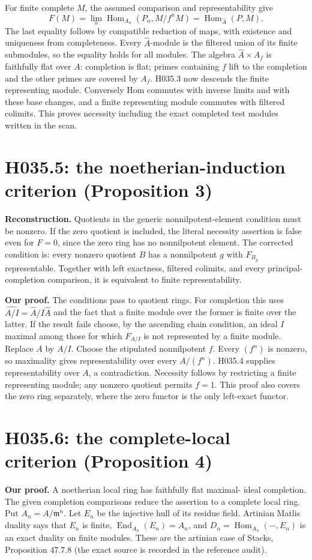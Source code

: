 For finite complete $M$, the assumed comparison and representability give
\[
 F(M)=\lim_n\operatorname{Hom}_{A_n}(P_n,M/f^nM)
       =\operatorname{Hom}_{\widehat A}(P,M).
\]
The last equality follows by compatible reduction of maps, with existence
and uniqueness from completeness. Every $\widehat A$-module is the
filtered union of its finite submodules, so the equality holds for all
modules. The algebra $\widehat A\times A_f$ is faithfully flat over
$A$: completion is flat; primes containing $f$ lift to the completion
and the other primes are covered by $A_f$. H035.3 now descends the finite
representing module. Conversely Hom commutes with inverse limits and
with these base changes, and a finite representing module commutes with
filtered colimits. This proves necessity including the exact completed
test modules written in the scan.

\section{H035.5: the noetherian-induction criterion (Proposition 3)}
\textbf{Reconstruction.} Quotients in the generic nonnilpotent-element
condition must be nonzero. If the zero quotient is included, the literal
necessity assertion is false even for $F=0$, since the zero ring has no
nonnilpotent element. The corrected condition is: every nonzero quotient
$B$ has a nonnilpotent $g$ with $F_{B_g}$ representable. Together with
left exactness, filtered colimits, and every principal-completion
comparison, it is equivalent to finite representability.

\textbf{Our proof.} The conditions pass to quotient rings. For completion
this uses $\widehat{A/I}=\widehat A/I\widehat A$ and the fact that a
finite module over the former is finite over the latter. If the result
fails choose, by the ascending chain condition, an ideal $I$ maximal
among those for which $F_{A/I}$ is not represented by a finite module.
Replace $A$ by $A/I$. Choose the stipulated nonnilpotent $f$. Every
$(f^n)$ is nonzero, so maximality gives representability over every
$A/(f^n)$. H035.4 supplies representability over $A$, a contradiction.
Necessity follows by restricting a finite representing module; any
nonzero quotient permits $f=1$. This proof also covers the zero ring
separately, where the zero functor is the only left-exact functor.

\section{H035.6: the complete-local criterion (Proposition 4)}
\textbf{Our proof.} A noetherian local ring has faithfully flat maximal-
ideal completion. The given completion comparisons reduce the assertion
to a complete local ring. Put $A_n=A/\mathfrak m^n$. Let $E_n$ be the
injective hull of its residue field. Artinian Matlis duality says that
$E_n$ is finite, $\operatorname{End}_{A_n}(E_n)=A_n$, and
$D_n=\operatorname{Hom}_{A_n}(-,E_n)$ is an exact duality on finite
modules. These are the artinian case of Stacks, Proposition 47.7.8
(the exact source is recorded in the reference audit).

